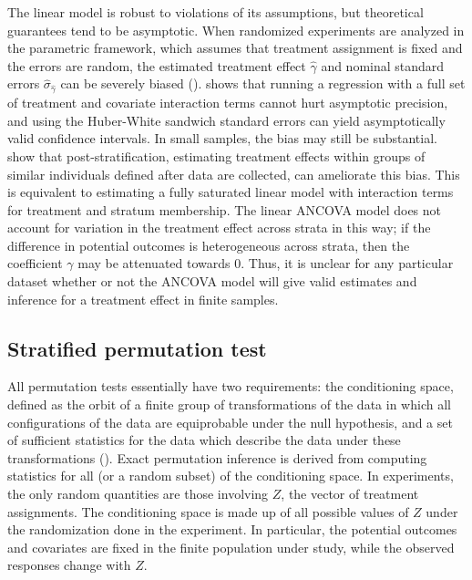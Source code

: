 \documentclass[12pt]{article}
\begin{document}
The linear model is robust to violations of its assumptions, but theoretical guarantees tend to be asymptotic.
When randomized experiments are analyzed in the parametric framework, which assumes that treatment assignment is fixed and the errors are random,
the estimated treatment effect $\hat{\gamma}$ and nominal standard errors $\hat{\sigma}_{\hat{\gamma}}$ can be severely biased (\cite{freedman_regression_2008, lin_agnostic_2013}).
\cite{lin_agnostic_2013} shows that running a regression with a full set of treatment and covariate interaction terms cannot hurt asymptotic precision, and using the Huber-White sandwich standard errors can yield asymptotically valid confidence intervals.
In small samples, the bias may still be substantial.
\cite{miratrix_adjusting_2013} show that post-stratification, estimating treatment effects within groups of similar individuals defined after data are collected, can ameliorate this bias.
This is equivalent to estimating a fully saturated linear model with interaction terms for treatment and stratum membership.
The linear ANCOVA model does not account for variation in the treatment effect across strata in this way;
if the difference in potential outcomes is heterogeneous across strata, then the coefficient $\gamma$ may be attenuated towards 0.
Thus, it is unclear for any particular dataset whether or not the ANCOVA model will give valid estimates and inference for a treatment effect in finite samples.


\subsection{Stratified permutation test}\label{subsec:strat_perm_test}
All permutation tests essentially have two requirements: the conditioning space, defined as the orbit of a finite group of transformations of the data in which all configurations of the data are equiprobable under the null hypothesis, and a set of sufficient statistics for the data which describe the data under these transformations (\cite{pesarin_permutation_2010}).
Exact permutation inference is derived from computing statistics for all (or a random subset) of the conditioning space.
In experiments, the only random quantities are those involving $Z$, the vector of treatment assignments.
The conditioning space is made up of all possible values of $Z$ under the randomization done in the experiment.
In particular, the potential outcomes and covariates are fixed in the finite population under study, while the observed responses change with $Z$.
\end{document}
